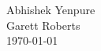 \begin{titlepage}
\begin{center}

{\Huge \linespread{2}}

\vfill

Abhishek Yenpure\\
Garett Roberts\\

\vfill
{\large \today}

\end{center}
\end{titlepage}
